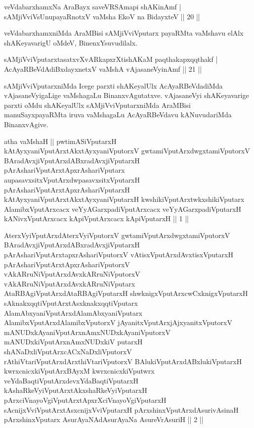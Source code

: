 \begin{shl}
veVdabarxhamxNa AraBayx saveVRSAmapi shAKinAmf | \\
sAMjiVviVsUnupayaRnotxV vaMsha EkoV na BidayxteV \hfill||  20 ||  
\end{shl}

\begin{artha}
veVdabarxhamxniMda AraMBisi sAMjiVviVputarx payaRMta vaMshavu elAlx 
shAKeyavarigU oMdeV, BinenxYsuvudilalx.
\end{artha}

\begin{shl}
sAMjiVviVputarxtasatxvXvARkapxrXtishAKaM paqthakapxqqthakf | \\
AcAyaRBeVdAdiBxdayxnetxV vaMshA vAjasaneVyinAmf \hfill||  21 ||  
\end{shl}

\begin{artha}
sAMjiVviVputarxniMda Icege parxti shAKeyalUlx AcAyaRBeVdadiMda 
vAja\-saneVyigaLige vaMshagaLu BinanxvAgutatxve. vAjasaneVyi 
shAKeyavarige parxti oMdu shAKeyalUlx sAMjiVviVputarxniMda 
AraMBisi manuSayxpayaRMta iruva vaMshagaLu AcAyaRBeVdavu 
kANuvudariMda BinanxvAgive.
\end{artha}


\begin{shl}
atha vaMshaH || pwtimASiVputarxH kAtAyxyaniVputArxtAkxtAyxyaniVputorxV gwtamiVputArxdwgxtamiVputorxV BAradAvxjiVputArxdABxradAvxjiVputarxH pArAshariVputArxtApxrAshariVputarx aupasavxsitxVputArxdwpasavxsitxVputarxH pArAshariVputArxtApxrAshariVputarxH kAtAyxyaniVputArxtAkxtAyxyaniVputarxH kwshikiVputArxtwkxshikiVputarx AlamibxVputArxcacx veYyAGarxpadiVputArxcacx veYyAGarxpadiVputarxH kANivxVputArxcacx kApiVputArxcacx kApiVputarxH || 1 || 
\end{shl}

\begin{shl}
AterxVyiVputArxdAterxVyiVputorxV gwtamiVputArxdwgxtamiVputorxV BAradAvxjiVputArxdABxradAvxjiVputarxH pArAshariVputArxtapxrAshariVputorxV vAtisxVputArxdAvxtisxVputarxH pArAshariVputArxtApxrAshariVputorxV vAkARruNiVputArxdAvxkARruNiVputorxV vAkARruNiVputArxdAvxkARruNiVputarx AtaRBAgiVputArxdAtaRBAgiVputarxH shwknigxVputArxcwCxknigxVputarxH sAknakxqqtiVputArxtAsxknakxqqtiVputarx AlamAbxyaniVputArxdAlamAbxyaniVputarx AlamibxVputArxdAlamibxVputorxV jAyanitxVputArxjAjxyanitxVputorxV mANUDxkAyaniVputArxnAmxNUDxkAyaniVputorxV mANUDxkiVputArxnAmxNUDxkiV putarxH shANaDxliVputArxcACxNaDxliVputorxV rAthiVtariVputArxdArxthiVtariVputorxV BAlukiVputArxdABxlukiVputarxH kwrxcnicxkiVputArxBAyxM kwrxcnicxkiVputwrx veYdaBaqtiVputArxdevxYdaBaqtiVputarxH kAshaRkeVyiVputArxtAkxshaRkeVyiVputarxH pArxciVnayoVgiVputArxtApxrXciVnayoVgiVputarxH sAcnijxVviVputArxtAsxcnijxVviVputarxH pArxshinxVputArxdAsurivAsinaH pArxshinxVputarx AsurAyaNAdAsurAyaNa AsureVrAsuriH || 2 ||
\end{shl}

